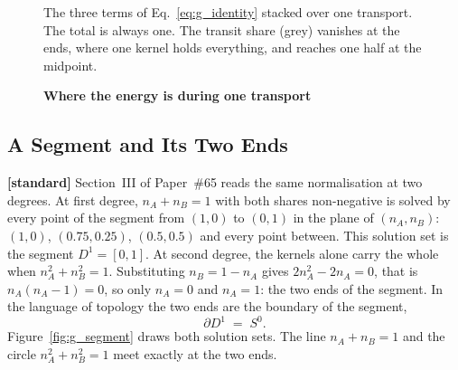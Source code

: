 \documentclass[%
 reprint, amsmath,amssymb, aps, prb, ]{revtex4-2}
\numberwithin{equation}{section}
\newcommand{\iphase}{\theta}
\begin{document}
\begin{figure}[t!]
\centering
{}
\caption{\textbf{Where the energy is during one transport}}
\label{fig:g_split}
\vspace{0.4em}
\begin{minipage}{0.95\columnwidth}
\justifying\small
The three terms of Eq.~\eqref{eq:g_identity} stacked over one transport. The total is always one. The transit share (grey) vanishes at the ends, where one kernel holds everything, and reaches one half at the midpoint.
\end{minipage}
\end{figure}

\subsection{A Segment and Its Two Ends}
\label{subsec:g_segment}

\textbf{[standard]} Section~III of Paper~\#65 reads the same normalisation at two degrees. At first degree, $n_A + n_B = 1$ with both shares non-negative is solved by every point of the segment from $(1,0)$ to $(0,1)$ in the plane of $(n_A,n_B)$: $(1,0)$, $(0.75,0.25)$, $(0.5,0.5)$ and every point between. This solution set is the segment $D^{1} = [0,1]$. At second degree, the kernels alone carry the whole when $n_A^{2} + n_B^{2} = 1$. Substituting $n_B = 1 - n_A$ gives $2n_A^{2} - 2n_A = 0$, that is $n_A(n_A - 1) = 0$, so only $n_A = 0$ and $n_A = 1$: the two ends of the segment. In the language of topology the two ends are the boundary of the segment,
\begin{equation}
\partial D^{1} \;=\; S^{0}.
\label{eq:g_boundary}
\end{equation}
Figure~\ref{fig:g_segment} draws both solution sets. The line $n_A + n_B = 1$ and the circle $n_A^{2} + n_B^{2} = 1$ meet exactly at the two ends.
\end{document}
